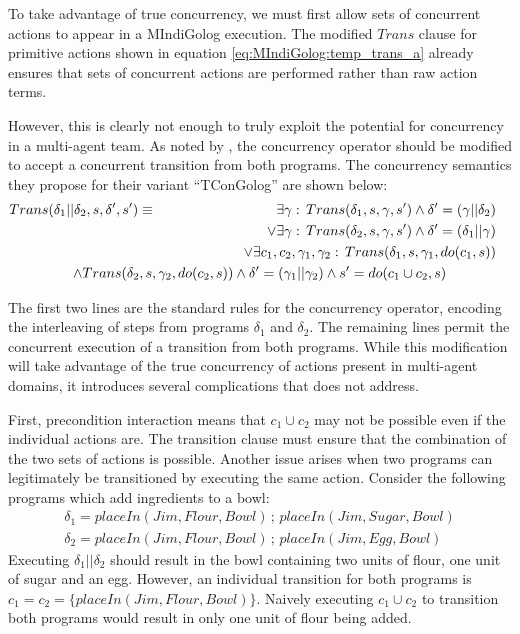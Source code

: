 To take advantage of true concurrency, we must first allow sets of
concurrent actions to appear in a MIndiGolog execution. The modified
$Trans$ clause for primitive actions shown in equation \ref{eq:MIndiGolog:temp_trans_a}
already ensures that sets of concurrent actions are performed rather
than raw action terms.

However, this is clearly not enough to truly exploit the potential
for concurrency in a multi-agent team. As noted by \citet{pinto99tcongolog},
the concurrency operator should be modified to accept a concurrent
transition from both programs. The concurrency semantics they propose
for their variant {}``TConGolog'' are shown below:\begin{multline*}
Trans(\delta_{1}||\delta_{2},s,\delta',s')\equiv\,\,\,\,\,\,\,\,\,\,\,\,\,\,\,\,\,\,\,\,\,\,\,\,\,\,\,\,\,\,\,\,\,\,\,\,\,\,\,\,\,\:\,\,\,\,\,\,\,\,\,\shoveright{\exists\gamma:\, Trans(\delta_{1},s,\gamma,s')\wedge\delta'=(\gamma||\delta_{2})}\\
\shoveright{\vee\exists\gamma:\, Trans(\delta_{2},s,\gamma,s')\wedge\delta'=(\delta_{1}||\gamma)}\\
\shoveright{\vee\exists c_{1},c_{2},\gamma_{1},\gamma_{2}:\, Trans(\delta_{1},s,\gamma_{1},do(c_{1},s))}\\
\wedge Trans(\delta_{2},s,\gamma_{2},do(c_{2},s))\wedge\delta'=(\gamma_{1}||\gamma_{2})\wedge s'=do(c_{1}\cup c_{2},s)\end{multline*}


The first two lines are the standard rules for the concurrency operator,
encoding the interleaving of steps from programs $\delta_{1}$ and
$\delta_{2}$. The remaining lines permit the concurrent execution
of a transition from both programs. While this modification will take
advantage of the true concurrency of actions present in multi-agent
domains, it introduces several complications that \citep{pinto99tcongolog}
does not address.

First, precondition interaction means that $c_{1}\cup c_{2}$ may
not be possible even if the individual actions are. The transition
clause must ensure that the combination of the two sets of actions
is possible. Another issue arises when two programs can legitimately
be transitioned by executing the same action. Consider the following
programs which add ingredients to a bowl:\begin{gather*}
\delta_{1}=placeIn(Jim,Flour,Bowl)\,;\, placeIn(Jim,Sugar,Bowl)\\
\delta_{2}=placeIn(Jim,Flour,Bowl)\,;\, placeIn(Jim,Egg,Bowl)\end{gather*}
 Executing $\delta_{1}||\delta_{2}$ should result in the bowl containing
two units of flour, one unit of sugar and an egg. However, an individual
transition for both programs is $c_{1}=c_{2}=\{placeIn(Jim,Flour,Bowl)\}$.
Naively executing $c_{1}\cup c_{2}$ to transition both programs would
result in only one unit of flour being added.

